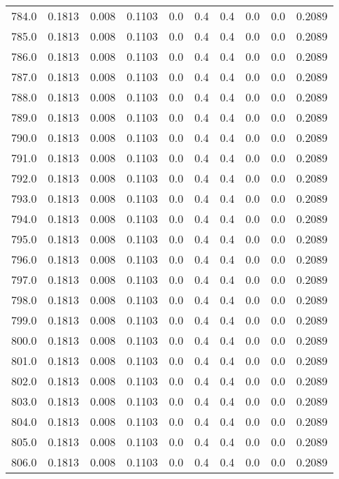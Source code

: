 \begin{longtable}{lrrrrrrrrr}
784.0 & 0.1813 & 0.008 & 0.1103 & 0.0 & 0.4 & 0.4 & 0.0 & 0.0 & 0.2089 \\
785.0 & 0.1813 & 0.008 & 0.1103 & 0.0 & 0.4 & 0.4 & 0.0 & 0.0 & 0.2089 \\
786.0 & 0.1813 & 0.008 & 0.1103 & 0.0 & 0.4 & 0.4 & 0.0 & 0.0 & 0.2089 \\
787.0 & 0.1813 & 0.008 & 0.1103 & 0.0 & 0.4 & 0.4 & 0.0 & 0.0 & 0.2089 \\
788.0 & 0.1813 & 0.008 & 0.1103 & 0.0 & 0.4 & 0.4 & 0.0 & 0.0 & 0.2089 \\
789.0 & 0.1813 & 0.008 & 0.1103 & 0.0 & 0.4 & 0.4 & 0.0 & 0.0 & 0.2089 \\
790.0 & 0.1813 & 0.008 & 0.1103 & 0.0 & 0.4 & 0.4 & 0.0 & 0.0 & 0.2089 \\
791.0 & 0.1813 & 0.008 & 0.1103 & 0.0 & 0.4 & 0.4 & 0.0 & 0.0 & 0.2089 \\
792.0 & 0.1813 & 0.008 & 0.1103 & 0.0 & 0.4 & 0.4 & 0.0 & 0.0 & 0.2089 \\
793.0 & 0.1813 & 0.008 & 0.1103 & 0.0 & 0.4 & 0.4 & 0.0 & 0.0 & 0.2089 \\
794.0 & 0.1813 & 0.008 & 0.1103 & 0.0 & 0.4 & 0.4 & 0.0 & 0.0 & 0.2089 \\
795.0 & 0.1813 & 0.008 & 0.1103 & 0.0 & 0.4 & 0.4 & 0.0 & 0.0 & 0.2089 \\
796.0 & 0.1813 & 0.008 & 0.1103 & 0.0 & 0.4 & 0.4 & 0.0 & 0.0 & 0.2089 \\
797.0 & 0.1813 & 0.008 & 0.1103 & 0.0 & 0.4 & 0.4 & 0.0 & 0.0 & 0.2089 \\
798.0 & 0.1813 & 0.008 & 0.1103 & 0.0 & 0.4 & 0.4 & 0.0 & 0.0 & 0.2089 \\
799.0 & 0.1813 & 0.008 & 0.1103 & 0.0 & 0.4 & 0.4 & 0.0 & 0.0 & 0.2089 \\
800.0 & 0.1813 & 0.008 & 0.1103 & 0.0 & 0.4 & 0.4 & 0.0 & 0.0 & 0.2089 \\
801.0 & 0.1813 & 0.008 & 0.1103 & 0.0 & 0.4 & 0.4 & 0.0 & 0.0 & 0.2089 \\
802.0 & 0.1813 & 0.008 & 0.1103 & 0.0 & 0.4 & 0.4 & 0.0 & 0.0 & 0.2089 \\
803.0 & 0.1813 & 0.008 & 0.1103 & 0.0 & 0.4 & 0.4 & 0.0 & 0.0 & 0.2089 \\
804.0 & 0.1813 & 0.008 & 0.1103 & 0.0 & 0.4 & 0.4 & 0.0 & 0.0 & 0.2089 \\
805.0 & 0.1813 & 0.008 & 0.1103 & 0.0 & 0.4 & 0.4 & 0.0 & 0.0 & 0.2089 \\
806.0 & 0.1813 & 0.008 & 0.1103 & 0.0 & 0.4 & 0.4 & 0.0 & 0.0 & 0.2089 \\

\end{longtable}
